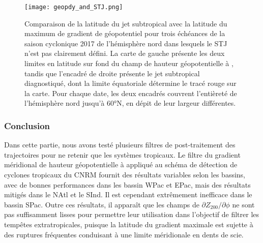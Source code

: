 \documentclass[../main.tex]{subfiles}
\begin{document}
\begin{figure}[tb]
    \centering
    \texttt{[image: geopdy\_and\_STJ.png]}
    \caption{Comparaison de la latitude du jet subtropical avec la latitude du maximum de gradient de géopotentiel pour trois échéances de la saison cyclonique
    2017 de l'hémisphère nord dans lesquels le STJ n'est pas clairement défini. La carte de gauche présente les deux limites en latitude sur fond du champ de
    hauteur géopotentielle à , tandis que l'encadré de droite présente le jet subtropical diagnostiqué, dont la limite équatoriale détermine le tracé rouge
    sur la carte. Pour chaque date, les deux encadrés couvrent l'entièreté de l'hémisphère nord jusqu'à \ang{60}N, en dépit de leur largeur différentes.}
    \label{fig:geopdy_and_STJ}
\end{figure}

\subsubsection*{Conclusion}

Dans cette partie, nous avons testé plusieurs filtres de post-traitement des trajectoires pour ne retenir que les systèmes tropicaux.
Le filtre du gradient méridional de hauteur géopotentielle à  appliqué au schéma de détection de cyclones tropicaux du CNRM fournit des résultats
variables selon les bassins, avec de bonnes performances dans les bassin WPac et EPac, mais des résultats mitigés dans le NAtl et le SInd. Il est cependant
extrêmement inefficace dans le bassin SPac. Outre ces résultats, il apparaît que les champs de $\partial Z_{200} / \partial \phi$ ne sont pas suffisamment
lisses pour permettre leur utilisation dans l'objectif de filtrer les tempêtes extratropicales, puisque la latitude du gradient maximale est sujette à des
ruptures fréquentes conduisant à une limite méridionale en dents de scie.
\end{document}
